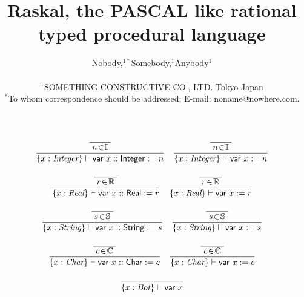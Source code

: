 \documentclass[12pt]{article}
\title{Raskal, the PASCAL like rational typed procedural language}
\author
{Nobody,$^{1\ast}$Somebody,$^{1}$Anybody$^{1}$\\
\\
\normalsize{$^{1}$SOMETHING CONSTRUCTIVE  CO., LTD. Tokyo Japan}\\
\normalsize{$^\ast$To whom correspondence should be addressed;
  E-mail: noname@nowhere.com.}
}
\date{}
\begin{document}
\maketitle

\begin{displaymath}
  \begin{array}{c}
    \begin{array}{rl}
      \dfrac{
        \dfrac{}{
          \raisebox{0.6ex}[2.3ex][0ex]{
            $n \!\in\! \mathbb{I}$
          }
        }
      }{
        \{x : \text{\it Integer} \} \vdash \mathsf{var}\ x :: \mathsf{Integer} := n
      }
      & \dfrac{
          \dfrac{}{
            \raisebox{0.6ex}[2.3ex][0ex]{
              $n \!\in\! \mathbb{I}$
            }
          }
        }{
          \{x : \text{\it Integer} \} \vdash \mathsf{var}\ x := n
        }
    \end{array}  \\
    \\
    
    \begin{array}{rl}
      \dfrac{
        \dfrac{}{
          \raisebox{0.6ex}[2.3ex][0ex]{
            $r \!\in\! \mathbb{R}$
          }
        }
      }{
        \{x : \text{\it Real} \} \vdash \mathsf{var}\ x :: \mathsf{Real} := r
      }
      & \dfrac{
          \dfrac{}{
            \raisebox{0.6ex}[2.3ex][0ex]{
              $r \!\in\! \mathbb{R}$
            }
          }
        }{
          \{x : \text{\it Real} \} \vdash \mathsf{var}\ x := r
        }
    \end{array}  \\
    \\
    
    \begin{array}{rl}
      \dfrac{
        \dfrac{}{
          \raisebox{0.6ex}[2.3ex][0ex]{
            $s \!\in\! \mathbb{S}$
          }
        }
      }{
        \{x : \text{\it String} \} \vdash \mathsf{var}\ x :: \mathsf{String} := s
      }
      & \dfrac{
          \dfrac{}{
            \raisebox{0.6ex}[2.3ex][0ex]{
              $s \!\in\! \mathbb{S}$
            }
          }
        }{
          \{x : \text{\it String} \} \vdash \mathsf{var}\ x := s
        }
    \end{array}  \\
    \\
    
    \begin{array}{rl}
      \dfrac{
        \dfrac{}{
          \raisebox{0.6ex}[2.3ex][0ex]{
            $c \!\in\! \mathbb{C}$
          }
        }
      }{
        \{x : \text{\it Char} \} \vdash \mathsf{var}\ x :: \mathsf{Char} := c
      }
      & \dfrac{
          \dfrac{}{
            \raisebox{0.6ex}[2.3ex][0ex]{
              $c \!\in\! \mathbb{C}$
            }
          }
        }{
          \{x : \text{\it Char} \} \vdash \mathsf{var}\ x := c
        }
    \end{array}  \\
    \\

    \begin{array}{c}
      \dfrac{}{
        \{x : \text{\it Bot} \} \vdash \mathsf{var}\ x
      }
    \end{array}
  \end{array}
\end{displaymath}
\end{document}
